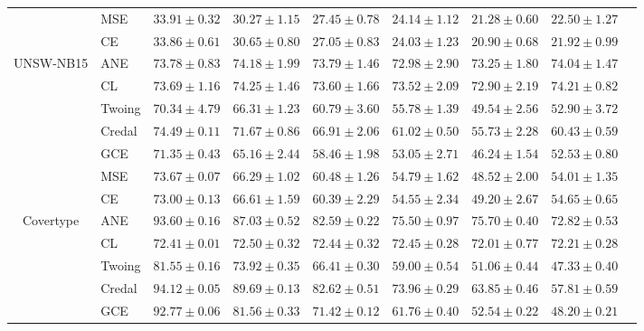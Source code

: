 \documentclass[letterpaper]{article} %
\begin{document}
\begin{table}[t]
\begin{tabular}{clccccccc}
 & MSE    & $\mathbf{33.91 \pm 0.32}$ & $\mathbf{30.27 \pm 1.15}$ & $\mathbf{27.45 \pm 0.78}$ & $\mathbf{24.14 \pm 1.12}$ & $\mathbf{21.28 \pm 0.60}$ & $\mathbf{22.50 \pm 1.27}$ \\ 
 & CE     & $\mathbf{33.86 \pm 0.61}$ & $\mathbf{30.65 \pm 0.80}$ & $\mathbf{27.05 \pm 0.83}$ & $\mathbf{24.03 \pm 1.23}$ & $\mathbf{20.90 \pm 0.68}$ & $\mathbf{21.92 \pm 0.99}$ \\ 
\hline
\multirow{7}{*}{UNSW-NB15}
 & ANE    & $\mathbf{73.78 \pm 0.83}$ & $\mathbf{74.18 \pm 1.99}$ & $\mathbf{73.79 \pm 1.46}$ & $\mathbf{72.98 \pm 2.90}$ & $\mathbf{73.25 \pm 1.80}$ & $\mathbf{74.04 \pm 1.47}$ \\ 
 & CL     & $\mathbf{73.69 \pm 1.16}$ & $\mathbf{74.25 \pm 1.46}$ & $\mathbf{73.60 \pm 1.66}$ & $\mathbf{73.52 \pm 2.09}$ & $\mathbf{72.90 \pm 2.19}$ & $\mathbf{74.21 \pm 0.82}$ \\ 
 & Twoing & $70.34 \pm 4.79$ & $66.31 \pm 1.23$ & $60.79 \pm 3.60$ & $55.78 \pm 1.39$ & $49.54 \pm 2.56$ & $52.90 \pm 3.72$ \\ 
 & Credal & $\mathbf{74.49 \pm 0.11}$ & $71.67 \pm 0.86$ & $66.91 \pm 2.06$ & $61.02 \pm 0.50$ & $55.73 \pm 2.28$ & $60.43 \pm 0.59$ \\ 
 & GCE    & $71.35 \pm 0.43$ & $65.16 \pm 2.44$ & $58.46 \pm 1.98$ & $53.05 \pm 2.71$ & $46.24 \pm 1.54$ & $52.53 \pm 0.80$ \\ 
 & MSE    & $73.67 \pm 0.07$ & $66.29 \pm 1.02$ & $60.48 \pm 1.26$ & $54.79 \pm 1.62$ & $48.52 \pm 2.00$ & $54.01 \pm 1.35$ \\ 
 & CE     & $73.00 \pm 0.13$ & $66.61 \pm 1.59$ & $60.39 \pm 2.29$ & $54.55 \pm 2.34$ & $49.20 \pm 2.67$ & $54.65 \pm 0.65$ \\ 
\hline
\multirow{7}{*}{Covertype}
 & ANE    & $93.60 \pm 0.16$ & $87.03 \pm 0.52$ & $\mathbf{82.59 \pm 0.22}$ & $\mathbf{75.50 \pm 0.97}$ & $\mathbf{75.70 \pm 0.40}$ & $\mathbf{72.82 \pm 0.53}$ \\ 
 & CL     & $72.41 \pm 0.01$ & $72.50 \pm 0.32$ & $72.44 \pm 0.32$ & $72.45 \pm 0.28$ & $72.01 \pm 0.77$ & $\mathbf{72.21 \pm 0.28}$ \\ 
 & Twoing & $81.55 \pm 0.16$ & $73.92 \pm 0.35$ & $66.41 \pm 0.30$ & $59.00 \pm 0.54$ & $51.06 \pm 0.44$ & $47.33 \pm 0.40$ \\ 
 & Credal & $94.12 \pm 0.05$ & $\mathbf{89.69 \pm 0.13}$ & $\mathbf{82.62 \pm 0.51}$ & $73.96 \pm 0.29$ & $63.85 \pm 0.46$ & $57.81 \pm 0.59$ \\ 
 & GCE    & $92.77 \pm 0.06$ & $81.56 \pm 0.33$ & $71.42 \pm 0.12$ & $61.76 \pm 0.40$ & $52.54 \pm 0.22$ & $48.20 \pm 0.21$ \\ 

\end{tabular}
\end{table}
\end{document}
